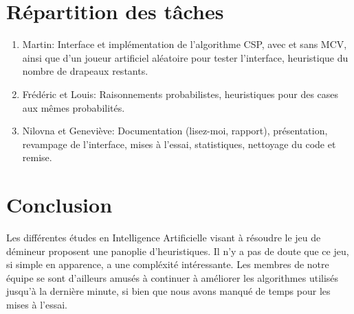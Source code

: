 \documentclass{article}
\begin{document}
\section{Répartition des tâches}
\begin{enumerate}
        \item Martin: Interface et implémentation de l’algorithme CSP, avec et sans 
              MCV, ainsi que d’un joueur artificiel aléatoire pour tester 
              l’interface, heuristique du nombre de drapeaux restants.
        \item Frédéric et Louis: Raisonnements probabilistes, heuristiques pour des cases aux mêmes probabilités.
        \item Nilovna et Geneviève: Documentation (lisez-moi, rapport), présentation, 
              revampage de l’interface, mises à l’essai, statistiques, nettoyage du code et remise.
\end{enumerate}

\section{Conclusion}
Les différentes études en Intelligence Artificielle visant à résoudre le jeu de démineur proposent une panoplie d’heuristiques. Il n’y a pas de doute que ce jeu, si simple en apparence, a une compléxité intéressante. Les membres de notre équipe se sont d’ailleurs amusés à continuer à améliorer les algorithmes utilisés jusqu’à la dernière minute, si bien que nous avons manqué de temps pour les mises à l’essai. 
\end{document}

